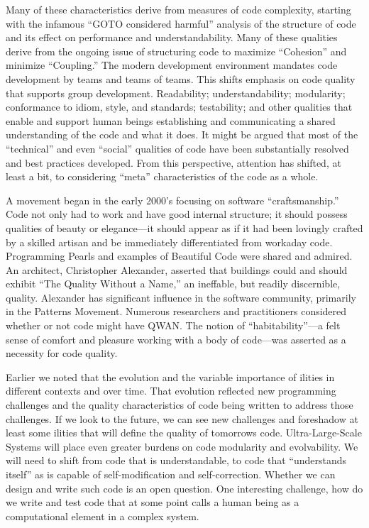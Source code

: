 Many of these characteristics derive from measures of code complexity, starting with the infamous ``GOTO considered harmful'' analysis of the structure of code and its effect on performance and understandability. Many of these qualities derive from the ongoing issue of structuring code to maximize ``Cohesion'' and minimize ``Coupling.''
The modern development environment mandates code development by teams and teams of teams. This shifts emphasis on code quality that supports group development. Readability; understandability; modularity; conformance to idiom, style, and standards; testability; and other qualities that enable and support human beings establishing and communicating a shared understanding of the code and what it does.
It might be argued that most of the ``technical'' and even ``social'' qualities of code have been substantially resolved and best practices developed. From this perspective, attention has shifted, at least a bit, to considering ``meta'' characteristics of the code as a whole.

A movement began in the early 2000's focusing on software ``craftsmanship.'' Code not only had to work and have good internal structure; it should possess qualities of beauty or elegance---it should appear as if it had been lovingly crafted by a skilled artisan and be immediately differentiated from workaday code. Programming Pearls and examples of Beautiful Code were shared and admired.
An architect, Christopher Alexander, asserted that buildings could and should exhibit ``The Quality Without a Name,'' an ineffable, but readily discernible, quality. Alexander has significant influence in the software community, primarily in the Patterns Movement. Numerous researchers and practitioners considered whether or not code might have QWAN. The notion of ``habitability''---a felt sense of comfort and pleasure working with a body of code---was asserted as a necessity for code quality.

Earlier we noted that the evolution and the variable importance of ilities in different contexts and over time. That evolution reflected new programming challenges and the quality characteristics of code being written to address those challenges.
If we look to the future, we can see new challenges and foreshadow at least some ilities that will define the quality of tomorrows code. Ultra-Large-Scale Systems will place even greater burdens on code modularity and evolvability.
We will need to shift from code that is understandable, to code that ``understands itself'' as is capable of self-modification and self-correction. Whether we can design and write such code is an open question. One interesting challenge, how do we write and test code that at some point calls a human being as a computational element in a complex system.

